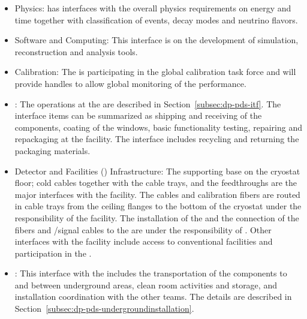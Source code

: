 \begin{itemize}
\item \dune Physics: \dual {} has interfaces with the overall physics requirements on energy and time together with classification of events, decay modes and neutrino flavors.

\item Software and Computing: This interface is on the development of simulation, reconstruction and analysis tools.

\item Calibration: The  is participating in the  global calibration task force and will provide handles to allow global monitoring of the  performance.

\item {}: The operations at the  are described in Section~\ref{subsec:dp-pds-itf}. The interface items can be summarized as shipping and receiving of the  components,  coating of the  windows, basic functionality testing, repairing and repackaging at the facility. The interface includes recycling and returning the packaging materials.

\item Detector and Facilities () Infrastructure: The 
 supporting base on the cryostat floor; cold cables together with the cable trays, and the feedthroughs are the major interfaces with the facility. The cables and calibration fibers are routed in cable trays from the ceiling \fdth flanges to the bottom of the cryostat under the responsibility of the facility. The installation of the  and the connection of the fibers and /signal cables to the  are under the responsibility of . Other interfaces with the facility include access to conventional facilities and participation in the . 

\item {}: This interface with the  includes the transportation of the  components to and between underground areas, clean room activities and storage, and installation coordination with the other teams. The details are described in Section~\ref{subsec:dp-pds-undergroundinstallation}.

\end{itemize}

